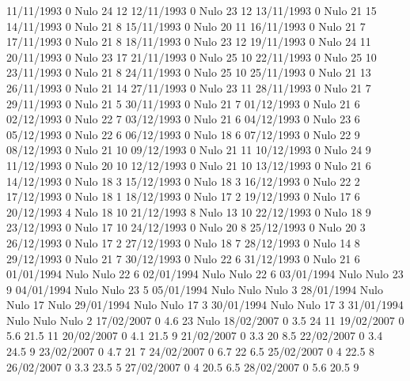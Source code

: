 11/11/1993  0     Nulo    24     12 
12/11/1993  0     Nulo    23     12 
13/11/1993  0     Nulo    21     15 
14/11/1993  0     Nulo    21     8 
15/11/1993  0     Nulo    20     11 
16/11/1993  0     Nulo    21     7 
17/11/1993  0     Nulo    21     8 
18/11/1993  0     Nulo    23     12 
19/11/1993  0     Nulo    24     11 
20/11/1993  0     Nulo    23     17 
21/11/1993  0     Nulo    25     10 
22/11/1993  0     Nulo    25     10 
23/11/1993  0     Nulo    21     8 
24/11/1993  0     Nulo    25     10 
25/11/1993  0     Nulo    21     13 
26/11/1993  0     Nulo    21     14 
27/11/1993  0     Nulo    23     11 
28/11/1993  0     Nulo    21     7 
29/11/1993  0     Nulo    21     5 
30/11/1993  0     Nulo    21     7 
01/12/1993  0     Nulo    21     6 
02/12/1993  0     Nulo    22     7 
03/12/1993  0     Nulo    21     6 
04/12/1993  0     Nulo    23     6 
05/12/1993  0     Nulo    22     6 
06/12/1993  0     Nulo    18     6 
07/12/1993  0     Nulo    22     9 
08/12/1993  0     Nulo    21     10 
09/12/1993  0     Nulo    21     11 
10/12/1993  0     Nulo    24     9 
11/12/1993  0     Nulo    20     10 
12/12/1993  0     Nulo    21     10 
13/12/1993  0     Nulo    21     6 
14/12/1993  0     Nulo    18     3 
15/12/1993  0     Nulo    18     3 
16/12/1993  0     Nulo    22     2 
17/12/1993  0     Nulo    18     1 
18/12/1993  0     Nulo    17     2 
19/12/1993  0     Nulo    17     6 
20/12/1993  4     Nulo    18     10 
21/12/1993  8     Nulo    13     10 
22/12/1993  0     Nulo    18     9 
23/12/1993  0     Nulo    17     10 
24/12/1993  0     Nulo    20     8 
25/12/1993  0     Nulo    20     3 
26/12/1993  0     Nulo    17     2 
27/12/1993  0     Nulo    18     7 
28/12/1993  0     Nulo    14     8 
29/12/1993  0     Nulo    21     7 
30/12/1993  0     Nulo    22     6 
31/12/1993  0     Nulo    21     6 
01/01/1994 Nulo   Nulo    22     6 
02/01/1994 Nulo   Nulo    22     6 
03/01/1994 Nulo   Nulo    23     9 
04/01/1994 Nulo   Nulo    23     5 
05/01/1994 Nulo   Nulo   Nulo    3 
28/01/1994 Nulo   Nulo    17    Nulo
29/01/1994 Nulo   Nulo    17     3 
30/01/1994 Nulo   Nulo    17     3 
31/01/1994 Nulo   Nulo   Nulo    2 
17/02/2007  0      4.6    23    Nulo
18/02/2007  0      3.5    24     11 
19/02/2007  0      5.6    21.5   11 
20/02/2007  0      4.1    21.5   9 
21/02/2007  0      3.3    20     8.5 
22/02/2007  0      3.4    24.5   9 
23/02/2007  0      4.7    21     7 
24/02/2007  0      6.7    22     6.5 
25/02/2007  0      4      22.5   8 
26/02/2007  0      3.3    23.5   5 
27/02/2007  0      4      20.5   6.5 
28/02/2007  0      5.6    20.5   9 
